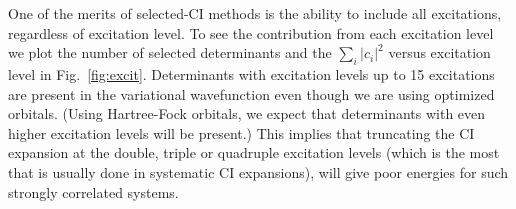 \documentclass[%
reprint,
 superscriptaddress,
 amsmath,amssymb,
 aps,
]{revtex4-1}
\begin{document}
One of the merits of selected-CI methods is the ability to include all excitations, regardless of excitation level.
To see the contribution from each excitation level we plot the number of selected determinants and the $\sum_i \left|c_i\right|^2$ versus excitation level in Fig.~\ref{fig:excit}.
Determinants with excitation levels up to 15 excitations are present in the variational wavefunction even though we are using optimized orbitals.
(Using Hartree-Fock orbitals, we expect that determinants with even higher excitation levels will be present.)
This implies that truncating the CI expansion at the double, triple or quadruple excitation levels (which is the most that is usually done in systematic
CI expansions), will give poor energies for such strongly correlated systems.




\end{document}
